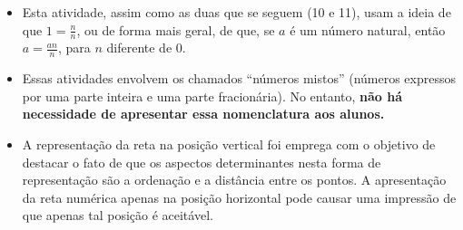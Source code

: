\begin{itemize} %
  \item     Esta atividade, assim como as duas que se seguem (10 e 11),   usam a ideia de que     $1 = \frac{n}{n}$, ou de forma mais geral, de que, se     $a$     é um número natural, então     $a = \frac{an}{n}$, para     $n$     diferente de 0.
  \item Essas atividades envolvem os chamados ``números mistos'' (números expressos por uma parte inteira e uma parte fracionária). No entanto, {\bf não há necessidade de apresentar essa nomenclatura aos alunos.}
\item A representação da reta na posição vertical foi emprega com o objetivo de destacar o fato de que os aspectos determinantes nesta forma de representação são a ordenação e a distância entre os pontos. A apresentação da reta numérica apenas na posição horizontal pode causar uma impressão de que apenas tal posição é aceitável.

\end{itemize} %



\clearpage

